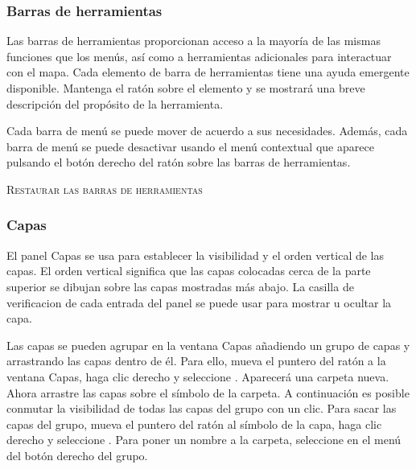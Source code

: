 
\subsubsection{Barras de herramientas}\label{label_toolbars}

Las barras de herramientas proporcionan acceso a la mayoría de las mismas funciones que los menús,
así como a herramientas adicionales para interactuar con el mapa. Cada elemento de barra de herramientas tiene
una ayuda emergente disponible. Mantenga el ratón sobre el elemento y se mostrará una breve descripción del
propósito de la herramienta.

Cada barra de menú se puede mover de acuerdo a sus necesidades. Además, cada
barra de menú se puede desactivar usando el menú contextual que aparece pulsando el botón derecho del ratón sobre las barras de herramientas.

\begin{Tip}
\caption{\textsc{Restaurar las barras de herramientas}} 
\end{Tip}

\subsubsection{Capas}\label{label_legend}

El panel Capas se usa para establecer la visibilidad y el orden vertical de las capas.
El orden vertical significa que las capas colocadas cerca de la parte superior se dibujan
sobre
las capas mostradas más abajo. La casilla de verificacion de cada entrada del panel
se puede usar para mostrar u ocultar la capa.

Las capas se pueden agrupar en la ventana Capas añadiendo un grupo de capas y arrastrando las capas 
dentro de él. Para ello, mueva el puntero del ratón a la ventana Capas, haga clic derecho y seleccione . 
Aparecerá una carpeta nueva. Ahora arrastre las capas sobre el símbolo de la carpeta. A continuación es posible
conmutar la visibilidad de todas las capas del grupo con un clic. Para sacar las capas del grupo, mueva 
el puntero del ratón al símbolo de la capa, haga clic derecho y seleccione . 
Para poner un nombre a la carpeta, seleccione  en el menú del botón derecho del grupo.

